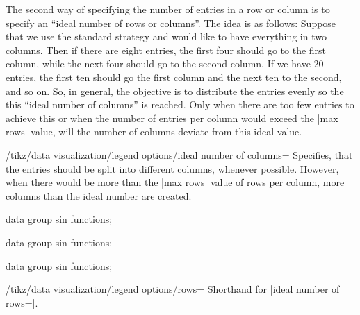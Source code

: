 The second way of specifying the number of entries in a row or column is to
specify an ``ideal number of rows or columns''. The idea is as follows: Suppose
that we use the standard strategy and would like to have everything in two
columns. Then if there are eight entries, the first four should go to the first
column, while the next four should go to the second column. If we have 20
entries, the first ten should go the first column and the next ten to the
second, and so on. So, in general, the objective is to distribute the entries
evenly so the this ``ideal number of columns'' is reached. Only when there are
too few entries to achieve this or when the number of entries per column would
exceed the |max rows| value, will the number of columns deviate from this ideal
value.

\begin{key}{/tikz/data visualization/legend options/ideal number of columns=}
    Specifies, that the entries should be split into  different
    columns, whenever possible. However, when there would be more than the
    |max rows| value of rows per column, more columns than the ideal number are
    created.
\begin{codeexample}[width=7cm]
\tikz \datavisualization [
  visualize as smooth line/.list={1,2,3,4,5,6,7,8},
  legend example, style sheet=vary hue,
  main legend={ideal number of columns=2}]
data group {sin functions};
\end{codeexample}
\begin{codeexample}[width=7cm]
\tikz \datavisualization [
  visualize as smooth line/.list={1,2,3,4,5,6,7,8},
  legend example, style sheet=vary hue,
  main legend={ideal number of columns=4}]
data group {sin functions};
\end{codeexample}
\begin{codeexample}[width=7cm]
\tikz \datavisualization [
  visualize as smooth line/.list={1,2,3,4,5,6,7,8},
  legend example, style sheet=vary hue,
  main legend={max rows=3,ideal number of columns=2}]
data group {sin functions};
\end{codeexample}
\end{key}

\begin{key}{/tikz/data visualization/legend options/rows=}
    Shorthand for |ideal number of rows=|.
\end{key}

